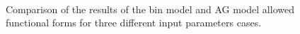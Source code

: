 \begin{figure}
  \centerline {
    \subfloat[][]{
      \begin{tikzpicture}
        
      \end{tikzpicture}
    }
    \subfloat[][]{
      \begin{tikzpicture}
        
      \end{tikzpicture}
    }
    \\
  }
  \centerline{
    \subfloat[][]{
      \begin{tikzpicture}
        
      \end{tikzpicture}
    }
  }
  \caption[Results of bin model for computing initial conditions]{Comparison of the results of the bin model and AG model allowed functional forms for three different input parameters cases.}
  \label{fig:bin_model}
\end{figure}
